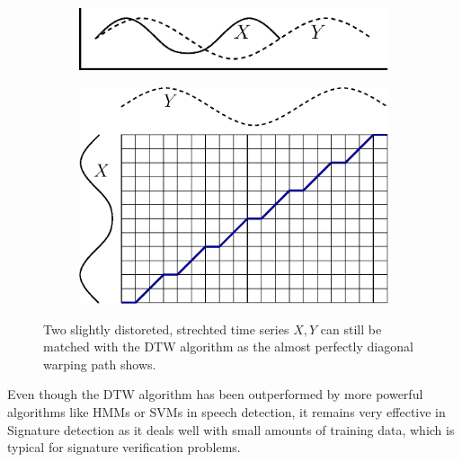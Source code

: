 \documentclass[a4paper, oneside]{csthesis}
\begin{document}
\begin{figure}
        \centering
        \begin{subfigure}[b]{0.45\textwidth}
                \centering
                \includegraphics[width=\textwidth]{figures/dtw-graphic1.eps}
                \label{fig:hmm1}
        \end{subfigure}%
        \quad
        \begin{subfigure}[b]{0.45\textwidth}
                \centering
                \includegraphics[width=\textwidth]{figures/dtw-graphic2.eps}
                \label{fig:hmm1}
        \end{subfigure}%

        \caption{Two slightly distoreted, strechted time series $X,Y$ can still be matched with the DTW algorithm as the almost perfectly diagonal warping path shows.}
        \label{fig:dtw-matrix}
\end{figure}



Even though the DTW algorithm has been outperformed by more powerful algorithms like HMMs or SVMs in speech detection, it remains very effective in Signature detection as it deals well with small amounts of training data, which is typical for signature verification problems.
\end{document}
